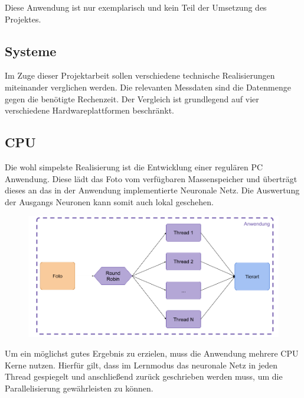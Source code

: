 Diese Anwendung ist nur exemplarisch und kein Teil der Umsetzung des Projektes.

\newpage


\subsection{Systeme}

Im Zuge dieser Projektarbeit sollen verschiedene technische Realisierungen miteinander verglichen werden. Die relevanten Messdaten sind die Datenmenge gegen die benötigte Rechenzeit. Der Vergleich ist grundlegend auf vier verschiedene Hardwareplattformen beschränkt.



\subsection{CPU}

Die wohl simpelste Realisierung ist die Entwicklung einer regulären PC Anwendung. Diese lädt das Foto vom verfügbaren Massenspeicher und überträgt dieses an das in der Anwendung implementierte Neuronale Netz. Die Auswertung der Ausgangs Neuronen kann somit auch lokal geschehen. 

\begin{figure}[htbp]
	\centering
		\includegraphics[width=1.00\textwidth]{BilderPDF/zielsetzung/System-PC.png}
	\label{fig:System-PC}
\end{figure}

Um ein möglichst gutes Ergebnis zu erzielen, muss die Anwendung mehrere CPU Kerne nutzen. Hierfür gilt, dass im Lernmodus das neuronale Netz in jeden Thread gespiegelt und anschließend zurück geschrieben werden muss, um die Parallelisierung gewährleisten zu können.\\

